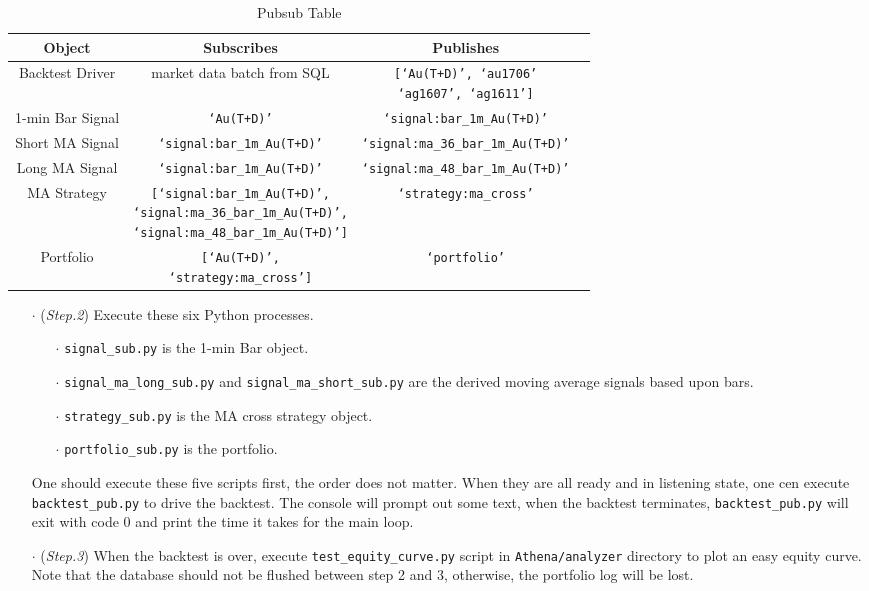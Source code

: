 \documentclass[a4paper, 11pt]{article}
\begin{document}
\begin{table}[ht]
\caption{Pubsub Table}
\centering
\begin{tabular}{cccc}
\hline
Object & Subscribes & Publishes \\
\hline
Backtest Driver & market data batch from SQL & \pbox{20cm}{\texttt{[`Au(T+D)', `au1706'} \\ \texttt{`ag1607', `ag1611']}} \\
1-min Bar Signal & \texttt{`Au(T+D)'} & \texttt{`signal:bar\_1m\_Au(T+D)'} \\
Short MA Signal & \texttt{`signal:bar\_1m\_Au(T+D)'} & \texttt{`signal:ma\_36\_bar\_1m\_Au(T+D)'} \\
Long MA Signal & \texttt{`signal:bar\_1m\_Au(T+D)'} & \texttt{`signal:ma\_48\_bar\_1m\_Au(T+D)'} \\
MA Strategy & \pbox{20cm}{\texttt{[`signal:bar\_1m\_Au(T+D)',}\\\texttt{`signal:ma\_36\_bar\_1m\_Au(T+D)',}\\\texttt{`signal:ma\_48\_bar\_1m\_Au(T+D)']}} & \texttt{`strategy:ma\_cross'} \\
Portfolio & \pbox{20cm}{\texttt{[`Au(T+D)',}\\\texttt{`strategy:ma\_cross']}} & \texttt{`portfolio'} \\
\hline
\end{tabular}
\label{table:nonlin}
\end{table}

\begin{itemize}
	\item[$\cdot$] (\textit{Step.2}) Execute these six Python processes.
	\begin{itemize}
		\item[$\cdot$] \texttt{signal\_sub.py} is the 1-min Bar object.
		\item[$\cdot$] \texttt{signal\_ma\_long\_sub.py} and \texttt{signal\_ma\_short\_sub.py} are the derived moving average signals based upon bars.
		\item[$\cdot$] \texttt{strategy\_sub.py} is the MA cross strategy object.
		\item[$\cdot$] \texttt{portfolio\_sub.py} is the portfolio.
	\end{itemize}
	One should execute these five scripts first, the order does not matter. When they are all ready and in listening state, one cen execute \texttt{backtest\_pub.py} to drive the backtest.
	The console will prompt out some text, when the backtest terminates, \texttt{backtest\_pub.py} will exit with code 0 and print the time it takes for the main loop.

	\item[$\cdot$] (\textit{Step.3}) When the backtest is over, execute \texttt{test\_equity\_curve.py} script in \texttt{Athena/analyzer} directory to plot an easy equity curve. Note that the database should not be flushed between step 2 and 3, otherwise, the portfolio log will be lost.
\end{itemize}
\end{document}
